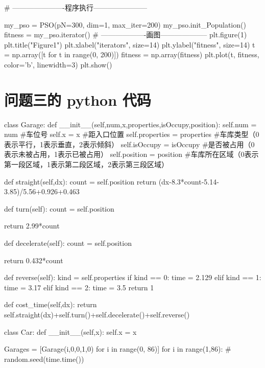 \documentclass{MathorCupmodeling}
\begin{document}
\begin{python}
				# ----------------------程序执行-----------------------
		
		
		my_pso = PSO(pN=300, dim=1, max_iter=200)
		my_pso.init_Population()
		fitness = my_pso.iterator()
		# -------------------画图--------------------
		plt.figure(1)
		plt.title("Figure1")
		plt.xlabel("iterators", size=14)
		plt.ylabel("fitness", size=14)
		t = np.array([t for t in range(0, 200)])
		fitness = np.array(fitness)
		plt.plot(t, fitness, color='b', linewidth=3)
		plt.show()
	\end{python}
	\section{问题三的 python 代码}
	\begin{python}
	class Garage:
		def __init__(self,num,x,properties,isOccupy,position):
			self.num = num #车位号
			self.x = x #距入口位置
			self.properties = properties #车库类型（0表示平行，1表示垂直，2表示倾斜）
			self.isOccupy = isOccupy #是否被占用（0表示未被占用，1表示已被占用）
			self.position = position #车库所在区域（0表示第一段区域，1表示第二段区域，2表示第三段区域）
	
		def straight(self,dx):
			count = self.position
			return  (dx-8.3*count-5.14-3.85)/5.56+0.926+0.463
	
		def turn(self):
			count = self.position
	
			return  2.99*count
	
		def decelerate(self):
			count = self.position
	
			return  0.432*count
	
		def reverse(self):
			kind = self.properties
			if kind == 0:
				time = 2.129
			elif kind == 1:
				time = 3.17
			elif kind == 2:
				time = 3.5
			return 1
	
		def cost_time(self,dx):
			return self.straight(dx)+self.turn()+self.decelerate()+self.reverse()
	
	
	
	class Car:
		def __init__(self,x):
			self.x = x
	
	
	
	Garages = [Garage(i,0,0,1,0) for i in range(0, 86)]
	for i in range(1,86):
		# random.seed(time.time())
	

\end{python}
\end{document}
